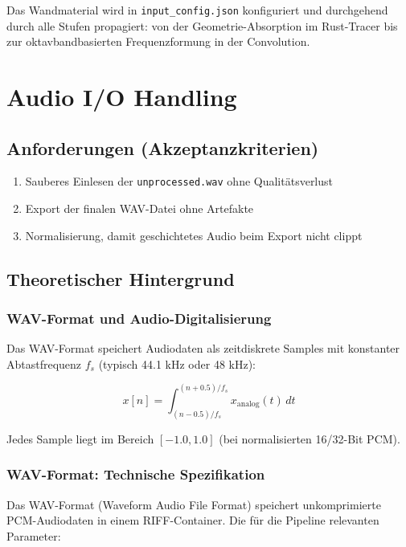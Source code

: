 \documentclass[11pt,a4paper,twoside]{report}
\begin{document}
Das Wandmaterial wird in \texttt{input\_config.json} konfiguriert und durchgehend durch alle Stufen propagiert: von der Geometrie-Absorption im Rust-Tracer bis zur oktavbandbasierten Frequenzformung in der Convolution.

\chapter{Audio I/O Handling}

\section{Anforderungen (Akzeptanzkriterien)}

\begin{enumerate}
    \item Sauberes Einlesen der \texttt{unprocessed.wav} ohne Qualit\"atsverlust
    \item Export der finalen WAV-Datei ohne Artefakte
    \item Normalisierung, damit geschichtetes Audio beim Export nicht clippt
\end{enumerate}

\section{Theoretischer Hintergrund}

\subsection{WAV-Format und Audio-Digitalisierung}

Das WAV-Format speichert Audiodaten als zeitdiskrete Samples mit konstanter Abtastfrequenz $f_s$ (typisch 44.1 kHz oder 48 kHz):

$$x[n] = \int_{(n-0.5)/f_s}^{(n+0.5)/f_s} x_{\text{analog}}(t) \, dt$$

Jedes Sample liegt im Bereich $[-1.0, 1.0]$ (bei normalisierten 16/32-Bit PCM).

\subsection{WAV-Format: Technische Spezifikation}

Das WAV-Format (Waveform Audio File Format) speichert unkomprimierte PCM-Audiodaten
in einem RIFF-Container. Die f\"ur die Pipeline relevanten Parameter:
\end{document}
